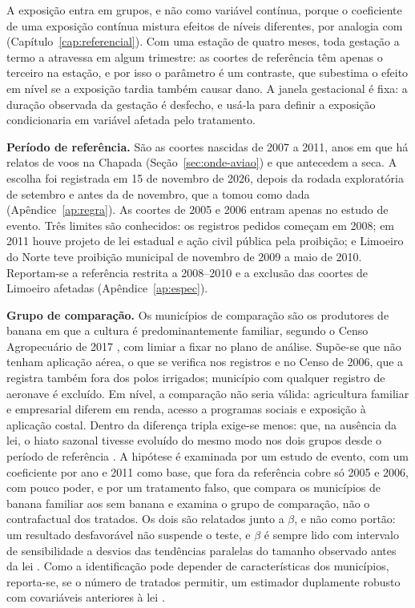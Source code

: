 A exposição entra em grupos, e não como variável contínua, porque o
coeficiente de uma exposição contínua mistura efeitos de níveis diferentes,
por analogia com 
(Capítulo~\ref{cap:referencial}). Com uma
estação de quatro meses, toda gestação a termo a atravessa em algum trimestre:
as coortes de referência têm apenas o terceiro na estação, e por isso o
parâmetro é um contraste, que subestima o efeito em nível se a exposição
tardia também causar dano. A janela gestacional é fixa: a duração observada da
gestação é desfecho, e usá-la para definir a exposição condicionaria em
variável afetada pelo tratamento.

\textbf{Período de referência.} São as coortes nascidas de 2007 a 2011, anos
em que há relatos de voos na Chapada (Seção~\ref{sec:onde-aviao}) e que
antecedem a seca. A escolha foi registrada em 15 de novembro de 2026, depois
da rodada exploratória de setembro e antes da de novembro, que a tomou como
dada (Apêndice~\ref{ap:regra}). As coortes de 2005 e 2006 entram apenas
no estudo de evento. Três limites são conhecidos: os registros pedidos começam
em 2008; em 2011 houve projeto de lei estadual e ação civil pública pela
proibição; e Limoeiro do Norte teve proibição municipal de novembro de 2009 a
maio de 2010. Reportam-se a referência restrita a 2008--2010 e a exclusão das
coortes de Limoeiro afetadas (Apêndice~\ref{ap:espec}).

\textbf{Grupo de comparação.} Os municípios de comparação são os produtores de
banana em que a cultura é predominantemente familiar, segundo o Censo
Agropecuário de 2017 \cite{ibge2017censoagro}, com limiar a fixar no plano de
análise. Supõe-se que não tenham aplicação aérea, o que se verifica nos
registros e no Censo de 2006, que a registra também fora dos polos irrigados;
município com qualquer registro de aeronave é excluído. Em nível, a comparação
não seria válida: agricultura familiar e empresarial diferem em renda, acesso
a programas sociais e exposição à aplicação costal. Dentro da diferença
tripla exige-se menos: que, na ausência da lei, o hiato sazonal tivesse
evoluído do mesmo modo nos dois grupos desde o período de referência
\cite{olden2022triple}. A hipótese é examinada por um estudo de evento,
com um coeficiente por ano e 2011 como base, que fora da referência cobre só
2005 e 2006, com pouco poder, e por um tratamento falso, que compara os
municípios de banana familiar aos sem banana e examina o grupo de comparação,
não o contrafactual dos tratados. Os dois são relatados junto a $\beta$, e não
como portão: um resultado desfavorável não suspende o teste, e $\beta$ é
sempre lido com intervalo de sensibilidade a desvios das tendências paralelas
do tamanho observado antes da lei
\cite{rambachan2023credible}. Como a identificação pode depender de características
dos municípios, reporta-se, se o número de tratados permitir, um estimador
duplamente robusto com covariáveis anteriores à lei \cite{ortiz2025triple}.

